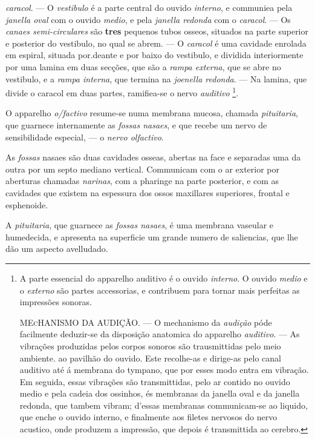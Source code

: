 \emph{caracol}. --- O \emph{vestibulo} é a parte central do ouvido \emph{interno}, e communiea pela \emph{janella oval} com o ouvido \emph{medio}, e pela \emph{janella redonda} com o \emph{caracol}. --- Os \emph{canaes semi-circulares} são \textbf{tres} pequenos tubos osseos, situados na parte superior e posterior do vestibulo, no qual se abrem. --- O \emph{caracol} é uma cavidade enrolada em espiral, situada por.deante e por baixo do vestibulo, e dividida interiormente por uma lamina em   duas secções, que são a \emph{rampa externa}, que se abre no vestibulo, e a \emph{rampa interna}, que termina na \emph{joenella redonda}. --- Na lamina, que divide o caracol em duas partes, ramifiea-se o nervo \emph{auditivo} \footnote{A parte essencial do apparelho auditivo é o ouvido \emph{interno}. O ouvido \emph{medio} e o \emph{externo} são partes accessorias, e contribuem para tornar mais perfeitas as impressões sonoras.\par \textsc{MEcHANISMO} DA AUDIÇÃO. --- O mechanismo da \emph{audição} póde facilmente deduzir-se da disposição anatomica do apparelho \emph{auditivo}. --- As vibrações produzidas pelos corpos sonoros são trausmittidas pelo meio ambiente. ao pavilhão do ouvido. Este recolhe-as e dirige-as pelo canal auditivo até á membrana do tympano, que por esses modo entra em vibração. Em seguida, essas vibrações são transmittidas, pelo ar contido no ouvido medio e pela cadeia dos ossinhos, és membranas da janella oval e da janella redonda, que tambem vibram; d'essas membranas communicam-se ao liquido, que enche o ouvido interno, e finalmente aos filetes nervosos do nervo acustico, onde produzem a impressão, que depois é transmittida ao cerebro.}.


 
O apparelho \emph{o/factivo} resume-se numa membrana mucosa, chamada \emph{pituitaria}, que guarnece internamente as \emph{fossas nasaes}, e que recebe um nervo de sensibilidade especial, --- o \emph{nervo olfactivo}.

As \emph{fossas} nasaes são duas cavidades osseas, abertas na face e separadas uma da outra por um septo mediano vertical. Communicam com o ar exterior por aberturas chamadas \emph{narinas}, com a pharinge na parte posterior, e com as cavidades que existem na espessura dos ossos maxillares superiores, frontal e esphenoide.

A \emph{pituitaria}, que guarnece as \emph{fossas nasaes}, é uma membrana vaseular e humedecida, e apresenta na superficie um grande numero de saliencias, que lhe dão um aspecto avelludado.

